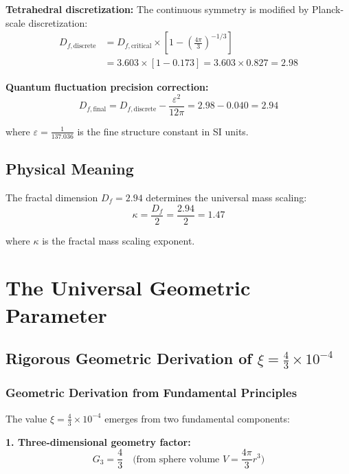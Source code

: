 \documentclass[12pt,a4paper]{article}
\numberwithin{equation}{section}
\newcommand{\xipar}{\xi}
\newcommand{\epsilonT}{\varepsilon}
\newcommand{\kappaT}{\kappa}
\newcommand{\Df}{D_f}
\newcommand{\Dfcritical}{D_{f,\text{critical}}}
\newcommand{\Dfdiscrete}{D_{f,\text{discrete}}}
\newcommand{\Dffinal}{D_{f,\text{final}}}
\begin{document}
	\textbf{Tetrahedral discretization:}
	The continuous symmetry is modified by Planck-scale discretization:
	\begin{align}
		\Dfdiscrete &= \Dfcritical \times \left[1 - \left(\frac{4\pi}{3}\right)^{-1/3}\right]\\
		&= 3.603 \times [1 - 0.173] = 3.603 \times 0.827 = 2.98
		\label{eq:df_discrete}
	\end{align}
	
	\textbf{Quantum fluctuation precision correction:}
	\begin{equation}
		\Dffinal = \Dfdiscrete - \frac{ \epsilonT^2}{12\pi} = 2.98 - 0.040 = 2.94
		\label{eq:df_final}
	\end{equation}
	
	where $ \epsilonT = \frac{1}{137.036}$ is the fine structure constant in SI units.
	
	\subsection{Physical Meaning}
	
	The fractal dimension $\Df = 2.94$ determines the universal mass scaling:
	\begin{equation}
		\kappaT = \frac{\Df}{2} = \frac{2.94}{2} = 1.47
		\label{eq:kappa}
	\end{equation}
	
	where $\kappaT$ is the fractal mass scaling exponent.
	
	\section{The Universal Geometric Parameter}
	
	\subsection{Rigorous Geometric Derivation of $\xipar = \frac{4}{3} \times 10^{-4}$}
	
\subsubsection{Geometric Derivation from Fundamental Principles}

The value $\xipar = \frac{4}{3} \times 10^{-4}$ emerges from two fundamental components:

\textbf{1. Three-dimensional geometry factor:}
\begin{equation}
	G_3 = \frac{4}{3} \quad \text{(from sphere volume } V = \frac{4\pi}{3}r^3\text{)}
\end{equation}
\end{document}
